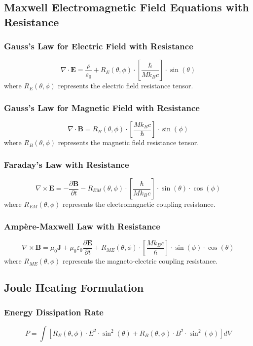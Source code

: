 ﻿\documentclass[12pt]{article}
\begin{document}
\subsection{Maxwell Electromagnetic Field Equations with Resistance}

\subsubsection{Gauss's Law for Electric Field with Resistance}
$$\nabla\cdot\mathbf{E} = \frac{\rho}{\varepsilon_0} + R_E(\theta,\phi)\cdot\left[\frac{\hbar}{Mk_Bc}\right]\cdot\sin(\theta)$$
where $R_E(\theta,\phi)$ represents the electric field resistance tensor.

\subsubsection{Gauss's Law for Magnetic Field with Resistance}
$$\nabla\cdot\mathbf{B} = R_B(\theta,\phi)\cdot\left[\frac{Mk_Bc}{\hbar}\right]\cdot\sin(\phi)$$
where $R_B(\theta,\phi)$ represents the magnetic field resistance tensor.

\subsubsection{Faraday's Law with Resistance}
$$\nabla\times\mathbf{E} = -\frac{\partial\mathbf{B}}{\partial t} - R_{EM}(\theta,\phi)\cdot\left[\frac{\hbar}{Mk_Bc}\right]\cdot\sin(\theta)\cdot\cos(\phi)$$
where $R_{EM}(\theta,\phi)$ represents the electromagnetic coupling resistance.

\subsubsection{Ampère-Maxwell Law with Resistance}
$$\nabla\times\mathbf{B} = \mu_0\mathbf{J} + \mu_0\varepsilon_0\frac{\partial\mathbf{E}}{\partial t} + R_{ME}(\theta,\phi)\cdot\left[\frac{Mk_Bc}{\hbar}\right]\cdot\sin(\phi)\cdot\cos(\theta)$$
where $R_{ME}(\theta,\phi)$ represents the magneto-electric coupling resistance.

\subsection{Joule Heating Formulation}

\subsubsection{Energy Dissipation Rate}
$$P = \int\left[R_E(\theta,\phi)\cdot E^2\cdot\sin^2(\theta) + R_B(\theta,\phi)\cdot B^2\cdot\sin^2(\phi)\right]dV$$
\end{document}

